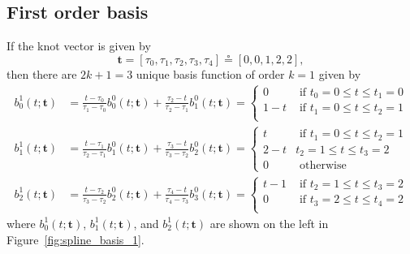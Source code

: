 \documentclass{article}
\newcommand{\defeq}{\circeq}
\begin{document}
\clearpage


\subsection{First order basis}

If the knot vector is given by
\[
\mathbf{t} = [\tau_0, \tau_1, \tau_2, \tau_3, \tau_4] \defeq [0, 0, 1, 2, 2],
\]
then there are $2k+1=3$ unique basis function of order $k=1$ given by
\begin{align*}
b_0^1(t; \mathbf{t}) &= \frac{t-\tau_0}{\tau_1-\tau_0} b_0^0(t;\mathbf{t}) + \frac{\tau_2-t}{\tau_2-\tau_1}b_1^0(t; \mathbf{t}) 
	= \begin{cases} 0   & \text{~if~} t_0=0 \leq t \leq t_1=0 \\
				    1-t & \text{~if~} t_1=0 \leq t \leq t_2=1 \\ 
 	  \end{cases}
\\ 
b_1^1(t; \mathbf{t}) &= \frac{t-\tau_1}{\tau_2-\tau_1} b_1^0(t;\mathbf{t}) + \frac{\tau_3-t}{\tau_3-\tau_2}b_2^0(t; \mathbf{t})
	= \begin{cases} t & \text{~if~} t_1=0 \leq t \leq t_2=1 \\ 
 									2-t & t_2=1 \leq t \leq t_3=2 \\
 									0 & \text{~otherwise}
 					    \end{cases}
\\ 
b_2^1(t; \mathbf{t}) &= \frac{t-\tau_2}{\tau_3-\tau_2} b_2^0(t;\mathbf{t}) + \frac{\tau_4-t}{\tau_4-\tau_3}b_3^0(t; \mathbf{t})
	= \begin{cases} t-1 & \text{~if~} t_2=1 \leq t \leq t_3=2 \\ 
 					0 & \text{~if~} t_3=2 \leq t \leq t_4=2 \\
 	  \end{cases}
\end{align*}
where $b_0^1(t; \mathbf{t})$, $b_1^1(t; \mathbf{t})$, and $b_2^1(t; \mathbf{t})$ are shown on the left in Figure~\ref{fig:spline_basis_1}.
\end{document}
